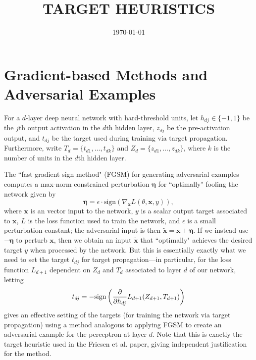 \documentclass[12pt,letterpaper]{article}
\begin{document}
\title{\uppercase{\textbf{\normalsize Target Heuristics}}}
\author{\small{\textsc{}}}
\date{\small{\textsc{\today}}}
\maketitle

\allowdisplaybreaks

\section{Gradient-based Methods and Adversarial Examples}

For a $d$-layer deep neural network with hard-threshold units, let $h_{dj} \in \{-1, 1\}$ be the $j$th output activation in the $d$th hidden layer, $z_{dj}$ be the pre-activation output, and $t_{dj}$ be the target used during training via target propagation. Furthermore, write $T_{d} = \{t_{d1}, \ldots, t_{dk}\}$ and $Z_{d} = \{z_{d1}, \ldots, z_{dk}\}$, where $k$ is the number of units in the $d$th hidden layer. 

The ``fast gradient sign method" (FGSM) for generating adversarial examples computes a max-norm constrained perturbation $\mathbf{\eta}$ for ``optimally" fooling the network given by
$$\mathbf{\eta} = \epsilon \cdot \textrm{sign}(\nabla_{\mathbf{x}}L(\theta, \mathbf{x}, y)),$$ 
where $\mathbf{x}$ is an vector input to the network, $y$ is a scalar output target associated to $\mathbf{x}$, $L$ is the loss function used to train the network, and $\epsilon$ is a small perturbation constant; the adversarial input is then $\tilde{\mathbf{x}} = \mathbf{x} + \mathbf{\eta}$. If we instead use $-\mathbf{\eta}$ to perturb $\mathbf{x}$, then we obtain an input $\tilde{\mathbf{x}}$ that ``optimally" achieves the desired target $y$ when processed by the network. But this is essentially exactly what we need to set the target $t_{dj}$ for target propagation---in particular, for the loss function $L_{d+1}$ dependent on $Z_{d}$ and $T_{d}$ associated to layer $d$ of our network, letting
$$t_{dj} = -\textrm{sign}\left({\partial \over \partial h_{dj}}L_{d+1}(Z_{d+1}, T_{d+1})\right)$$
gives an effective setting of the targets (for training the network via target propagation) using a method analogous to applying FGSM to create an adversarial example for the perceptron at layer $d$. Note that this is exactly the target heuristic used in the Friesen et al. paper, giving independent justification for the method. 
\end{document}
